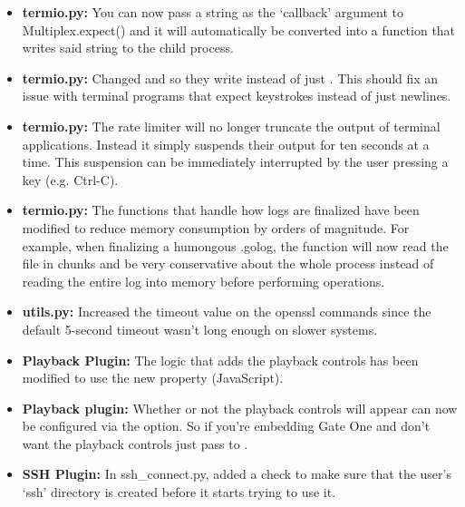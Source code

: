 \documentclass[letterpaper,10pt,openany]{sphinxmanual}
\begin{document}
\begin{itemize}
\item {} 
\textbf{termio.py:}  You can now pass a string as the `callback' argument to Multiplex.expect() and it will automatically be converted into a function that writes said string to the child process.

\item {} 
\textbf{termio.py:}  Changed  and  so they write  instead of just .  This should fix an issue with terminal programs that expect keystrokes instead of just newlines.

\item {} 
\textbf{termio.py:} The rate limiter will no longer truncate the output of terminal applications.  Instead it simply suspends their output for ten seconds at a time.  This suspension can be immediately interrupted by the user pressing a key (e.g. Ctrl-C).

\item {} 
\textbf{termio.py:}  The functions that handle how logs are finalized have been modified to reduce memory consumption by orders of magnitude.  For example, when finalizing a humongous .golog, the  function will now read the file in chunks and be very conservative about the whole process instead of reading the entire log into memory before performing operations.

\item {} 
\textbf{utils.py:}  Increased the timeout value on the openssl commands since the default 5-second timeout wasn't long enough on slower systems.

\item {} 
\textbf{Playback Plugin:}  The logic that adds the playback controls has been modified to use the new  property (JavaScript).

\item {} 
\textbf{Playback plugin:}  Whether or not the playback controls will appear can now be configured via the  option.  So if you're embedding Gate One and don't want the playback controls just pass  to {\hyperref[Developer/js_gateone:GateOne.init]{}}.

\item {} 
\textbf{SSH Plugin:}  In ssh\_connect.py, added a check to make sure that the user's `ssh' directory is created before it starts trying to use it.


\end{itemize}
\end{document}
